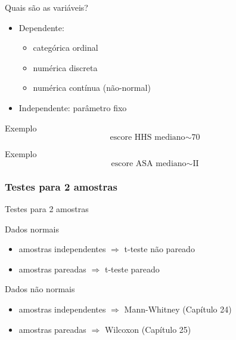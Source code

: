 \documentclass{beamer}
\begin{document}
\begin{frame}{Quais são as variáveis?}
  \begin{itemize}
    \small
  \item Dependente:
    \begin{itemize}
      \footnotesize
    \item categórica ordinal
    \item numérica discreta
    \item numérica contínua (não-normal)
    \end{itemize}
  \item Independente: parâmetro fixo
  \end{itemize}
  \vfill
  \begin{exampleblock}{Exemplo}
    \begin{displaymath}
      \text{escore HHS mediano} \sim \text{70}
    \end{displaymath}
  \end{exampleblock}
  \begin{exampleblock}{Exemplo}
    \begin{displaymath}
      \text{escore ASA mediano} \sim \text{II}
  \end{displaymath}

  \end{exampleblock}
\end{frame}

\subsubsection[2 médias]{Testes para 2 amostras}

\begin{frame}{Testes para 2 amostras}
  \begin{block}{Dados normais}
    \begin{itemize}
    \small
    \item amostras independentes $\Rightarrow$ t-teste não pareado
    \item amostras pareadas $\Rightarrow$ t-teste pareado
    \end{itemize}
  \end{block}
  \bigskip
  \begin{block}{Dados não normais}
    \begin{itemize}
    \small
    \item amostras independentes $\Rightarrow$ \alert{Mann-Whitney} {\footnotesize (Capítulo 24)}%
    \item amostras pareadas $\Rightarrow$ Wilcoxon {\footnotesize (Capítulo 25)}
    \end{itemize}
  \end{block}
\end{frame}
\end{document}
